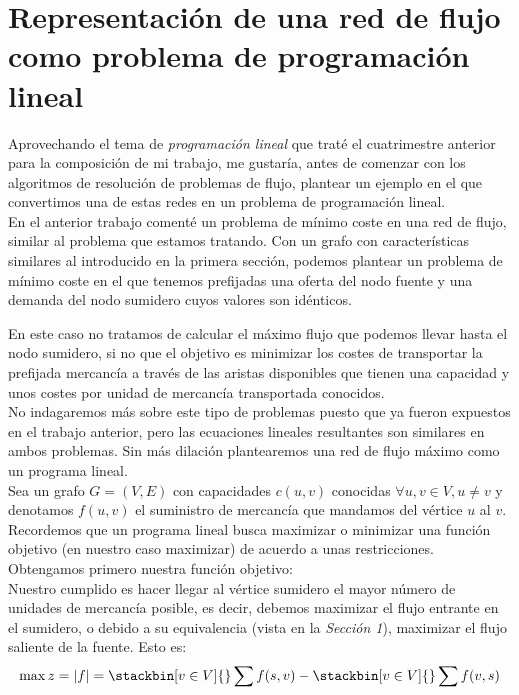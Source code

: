 \section{Representación de una red de flujo como problema de programación lineal}

Aprovechando el tema de \textit{programación lineal} que traté el cuatrimestre anterior para la composición de mi trabajo, me gustaría, antes de comenzar con los algoritmos de resolución de problemas de flujo, plantear un ejemplo en el que convertimos una de estas redes en un problema de programación lineal.\\

En el anterior trabajo comenté un problema de mínimo coste en una red de flujo, similar al problema que estamos tratando. Con un grafo con características similares al introducido en la primera sección, podemos plantear un problema de mínimo coste en el que tenemos prefijadas una oferta del nodo fuente y una demanda del nodo sumidero cuyos valores son idénticos.

En este caso no tratamos de calcular el máximo flujo que podemos llevar hasta el nodo sumidero, si no que el objetivo es minimizar los costes de transportar la prefijada mercancía a través de las aristas disponibles que tienen una capacidad y unos costes por unidad de mercancía transportada conocidos.\\

No indagaremos más sobre este tipo de problemas puesto que ya fueron expuestos en el trabajo anterior, pero las ecuaciones lineales resultantes son similares en ambos problemas. Sin más dilación plantearemos una red de flujo máximo como un programa lineal.\\

Sea un grafo $G=(V,E)$ con capacidades $c(u,v)$ conocidas $\forall u,v\in V, u\neq v$ y denotamos $f(u,v)$ el suministro de mercancía que mandamos del vértice $u$ al $v$.\\
Recordemos que un programa lineal busca maximizar o minimizar una función objetivo (en nuestro caso maximizar) de acuerdo a unas restricciones. Obtengamos primero nuestra función objetivo:\\

Nuestro cumplido es hacer llegar al vértice sumidero el mayor número de unidades de mercancía posible, es decir, debemos maximizar el flujo entrante en el sumidero, o debido a su equivalencia (vista en la \textit{Sección 1}), maximizar el flujo saliente de la fuente. Esto es:
\[\max z = |f| = \stackbin[v\in V]{}\sum f(s,v)- \stackbin[v\in V]{}\sum f(v,s)\]

